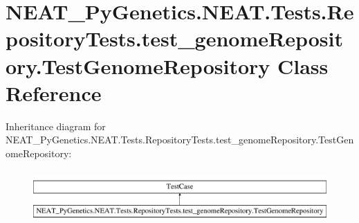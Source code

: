 \hypertarget{class_n_e_a_t___py_genetics_1_1_n_e_a_t_1_1_tests_1_1_repository_tests_1_1test__genome_repository_1_1_test_genome_repository}{}\section{N\+E\+A\+T\+\_\+\+Py\+Genetics.\+N\+E\+A\+T.\+Tests.\+Repository\+Tests.\+test\+\_\+genome\+Repository.\+Test\+Genome\+Repository Class Reference}
\label{class_n_e_a_t___py_genetics_1_1_n_e_a_t_1_1_tests_1_1_repository_tests_1_1test__genome_repository_1_1_test_genome_repository}
Inheritance diagram for N\+E\+A\+T\+\_\+\+Py\+Genetics.\+N\+E\+A\+T.\+Tests.\+Repository\+Tests.\+test\+\_\+genome\+Repository.\+Test\+Genome\+Repository\+:\begin{figure}[H]
\begin{center}
\leavevmode
\includegraphics[height=2.000000cm]{class_n_e_a_t___py_genetics_1_1_n_e_a_t_1_1_tests_1_1_repository_tests_1_1test__genome_repository_1_1_test_genome_repository}
\end{center}
\end{figure}
